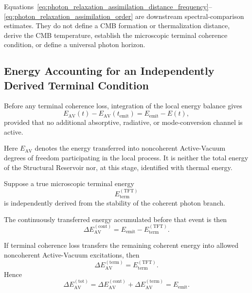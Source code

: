 Equations~\eqref{eq:photon_relaxation_assimilation_distance_frequency}--%
\eqref{eq:photon_relaxation_assimilation_order} are downstream
spectral-comparison estimates. They do not define a CMB formation or
thermalization distance, derive the CMB temperature, establish the microscopic
terminal coherence condition, or define a universal photon horizon.


\subsection{Energy Accounting for an Independently Derived Terminal Condition}
\label{subsec:photon_relaxation_assimilation_energy_accounting}

Before any terminal coherence loss, integration of the local energy balance
gives
\begin{equation}
    E_{\mathrm{AV}}(t)
    -
    E_{\mathrm{AV}}
    \left(
        t_{\mathrm{emit}}
    \right)
    =
    E_{\mathrm{emit}}
    -
    E(t),
    \label{eq:photon_relaxation_integrated_reservoir_energy}
\end{equation}
provided that no additional absorptive, radiative, or mode-conversion channel
is active.

Here \(E_{\mathrm{AV}}\) denotes the energy transferred into noncoherent
Active-Vacuum degrees of freedom participating in the local process. It is
neither the total energy of the Structural Reservoir nor, at this stage,
identified with thermal energy.

Suppose a true microscopic terminal energy
\begin{equation}
    E_{\mathrm{term}}^{(\mathrm{TFT})}
\end{equation}
is independently derived from the stability of the coherent photon branch.

The continuously transferred energy accumulated before that event is then
\begin{equation}
    \Delta E_{\mathrm{AV}}^{(\mathrm{cont})}
    =
    E_{\mathrm{emit}}
    -
    E_{\mathrm{term}}^{(\mathrm{TFT})}.
    \label{eq:photon_relaxation_continuous_reservoir_transfer}
\end{equation}

If terminal coherence loss transfers the remaining coherent energy into
allowed noncoherent Active-Vacuum excitations, then
\begin{equation}
    \Delta E_{\mathrm{AV}}^{(\mathrm{term})}
    =
    E_{\mathrm{term}}^{(\mathrm{TFT})}.
    \label{eq:photon_relaxation_terminal_assimilation_energy}
\end{equation}
Hence
\begin{equation}
    \Delta E_{\mathrm{AV}}^{(\mathrm{tot})}
    =
    \Delta E_{\mathrm{AV}}^{(\mathrm{cont})}
    +
    \Delta E_{\mathrm{AV}}^{(\mathrm{term})}
    =
    E_{\mathrm{emit}}.
    \label{eq:photon_relaxation_total_reservoir_transfer}
\end{equation}

